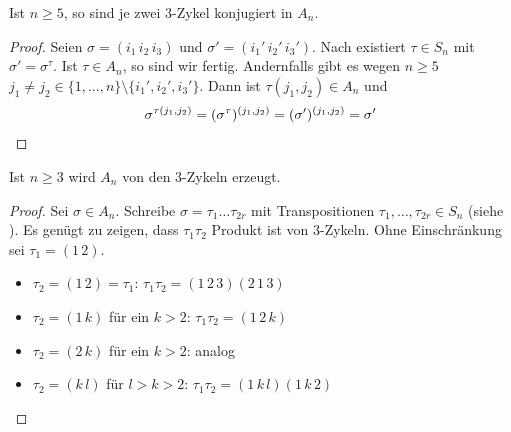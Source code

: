 \begin{lemma}
	Ist $n \geq 5$, so sind je zwei $3$-Zykel konjugiert in $A_n$.
\end{lemma}
\begin{proof}
	Seien $\sigma=(i_1\, i_2\, i_3)$ und $\sigma'=(i_1'\, i_2'\, i_3')$. Nach  existiert $\tau\in S_n$ mit $\sigma'=\sigma^\tau$. Ist $\tau\in A_n$, so sind wir fertig. Andernfalls gibt es wegen $n\ge 5$ $j_1\neq j_2\in\{1,...,n\}\setminus \{i_1',i_2',i_3'\}$. Dann ist $\tau(j_1,j_2)\in A_n$ und
	\begin{align}
		\sigma^{\tau(j_1,j_2)} = (\sigma^\tau)^{(j_1,j_2)} = (\sigma')^{(j_1,j_2)} = \sigma'\notag
	\end{align}
\end{proof}

\begin{lemma}
	Ist $n\geq 3$ wird $A_n$ von den $3$-Zykeln erzeugt.
\end{lemma}
\begin{proof}
	Sei $\sigma \in A_n$. Schreibe $\sigma=\tau_1 \dots \tau_{2r}$ mit Transpositionen $\tau_1,\dots,\tau_{2r} \in S_n$ (siehe ). Es genügt zu zeigen, dass $\tau_1\tau_2$ Produkt ist von $3$-Zykeln. Ohne Einschränkung sei $\tau_1=(1\, 2)$.
	\begin{itemize}
		\item $\tau_2 = (1\, 2) = \tau_1$: $\tau_1\tau_2 = (1\, 2\, 3)(2\, 1\, 3)$
		\item $\tau_2 = (1\, k)$ für ein $k>2$: $\tau_1\tau_2 = (1\, 2\, k)$
		\item $\tau_2 = (2\, k)$ für ein $k>2$: analog
		\item $\tau_2 = (k\, l)$ für $l>k>2$: $\tau_1\tau_2 = (1\, k\, l)(1\, k\, 2)$
	\end{itemize}
\end{proof}


